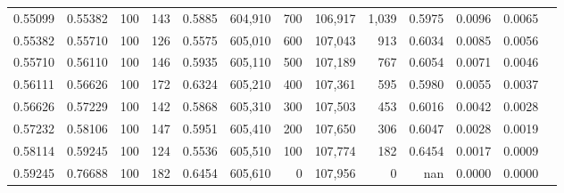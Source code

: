 \begin{tabular}{rrrrrrrrrrrrr}
0.55099 & 0.55382 &   100 & 143 &                                     0.5885 & 604,910 &     700 & 106,917 &   1,039 & 0.5975 & 0.0096 & 0.0065 \\
0.55382 & 0.55710 &   100 & 126 &                                     0.5575 & 605,010 &     600 & 107,043 &     913 & 0.6034 & 0.0085 & 0.0056 \\
0.55710 & 0.56110 &   100 & 146 &                                     0.5935 & 605,110 &     500 & 107,189 &     767 & 0.6054 & 0.0071 & 0.0046 \\
0.56111 & 0.56626 &   100 & 172 &                                     0.6324 & 605,210 &     400 & 107,361 &     595 & 0.5980 & 0.0055 & 0.0037 \\
0.56626 & 0.57229 &   100 & 142 &                                     0.5868 & 605,310 &     300 & 107,503 &     453 & 0.6016 & 0.0042 & 0.0028 \\
0.57232 & 0.58106 &   100 & 147 &                                     0.5951 & 605,410 &     200 & 107,650 &     306 & 0.6047 & 0.0028 & 0.0019 \\
0.58114 & 0.59245 &   100 & 124 &                                     0.5536 & 605,510 &     100 & 107,774 &     182 & 0.6454 & 0.0017 & 0.0009 \\
0.59245 & 0.76688 &   100 & 182 &                                     0.6454 & 605,610 &       0 & 107,956 &       0 &    nan & 0.0000 & 0.0000 \\
\bottomrule
\end{tabular}
